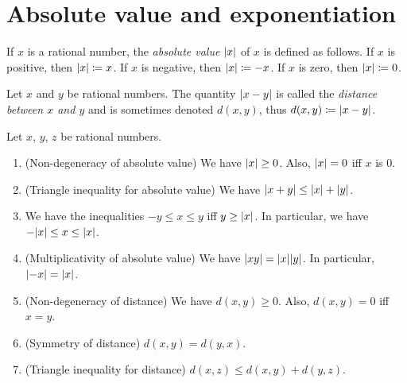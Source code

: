 \section{Absolute value and exponentiation}\label{sec:4.3}

\begin{defn}\label{4.3.1}
	If \(x\) is a rational number, the \emph{absolute value} \(\left\lvert x\right\rvert\) of \(x\) is defined as follows.
	If \(x\) is positive, then \(\left\lvert x\right\rvert \coloneqq x\).
	If \(x\) is negative, then \(\left\lvert x\right\rvert \coloneqq -x\).
	If \(x\) is zero, then \(\left\lvert x\right\rvert \coloneqq 0\).
\end{defn}

\begin{defn}[Distance]\label{4.3.2}
	Let \(x\) and \(y\) be rational numbers.
	The quantity \(\left\lvert x - y\right\rvert\) is called the \emph{distance between \(x\) and \(y\)} and is sometimes denoted \(d(x, y)\), thus \(d(x, y) \coloneqq \left\lvert x - y\right\rvert\).
\end{defn}

\begin{prop}\label{4.3.3}
	Let \(x\), \(y\), \(z\) be rational numbers.
	\begin{enumerate}
		\item (Non-degeneracy of absolute value)
		      We have \(\left\lvert x\right\rvert \geq 0\).
		      Also, \(\left\lvert x\right\rvert = 0\) iff \(x\) is \(0\).
		\item (Triangle inequality for absolute value)
		      We have \(\left\lvert x + y\right\rvert \leq \left\lvert x\right\rvert + \left\lvert y\right\rvert\).
		\item We have the inequalities \(-y \leq x \leq y\) iff \(y \geq \left\lvert x\right\rvert\).
		      In particular, we have \(-\abs{x} \leq x \leq \abs{x}\).
		\item (Multiplicativity of absolute value)
		      We have \(\abs{xy} = \abs{x} \abs{y}\).
		      In particular, \(\left\lvert-x\right\rvert = \left\lvert x\right\rvert\).
		\item (Non-degeneracy of distance)
		      We have \(d(x, y) \geq 0\).
		      Also, \(d(x, y) = 0\) iff \(x = y\).
		\item (Symmetry of distance)
		      \(d(x, y) = d(y, x)\).
		\item (Triangle inequality for distance)
		      \(d(x, z) \leq d(x, y) + d(y, z)\).
	\end{enumerate}
\end{prop}


